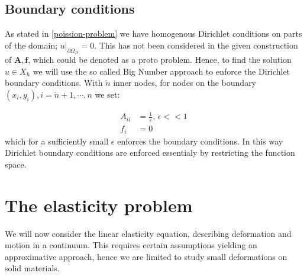 \documentclass[a4paper,english]{elsarticle}%
\newcommand{\restr}[2]{\ensuremath{\left.#1\right|_{#2}}}
\begin{document}
\subsection{Boundary conditions}
As stated in \eqref{poission-problem} we have homogenous Dirichlet conditions on parts of the domain; $\restr{u}{\partial \Omega_D} =  0 $. This has not been considered in the given construction of $\bm A,\bm f$, which could be denoted as a proto problem. Hence, to find the solution $u \in X_h$ we will use the so called Big Number approach \cite[p. 16]{Lecture_Note_4} to enforce the Dirichlet boundary conditions. With $\tilde n$ inner nodes, for nodes on the boundary $(x_i,y_i), i= \tilde n +1,\cdots, n$ we set:


\begin{equation*}
    \begin{aligned}
    A_{ii} &= \frac{1}{\epsilon}, \, \epsilon << 1 \\
    f_i &= 0
    \end{aligned}
\end{equation*}
which for a sufficiently small $\epsilon$ enforces the boundary conditions. In this way Dirichlet boundary conditions are enforced essentialy by restricting the function space. 


\section{The elasticity problem } \label{seq-elasticity}

We will now consider the linear elasticity equation, describing deformation and motion in a continuum. This requires certain assumptions yielding an approximative approach, hence we are limited to study small deformations on solid materials.
\end{document}
